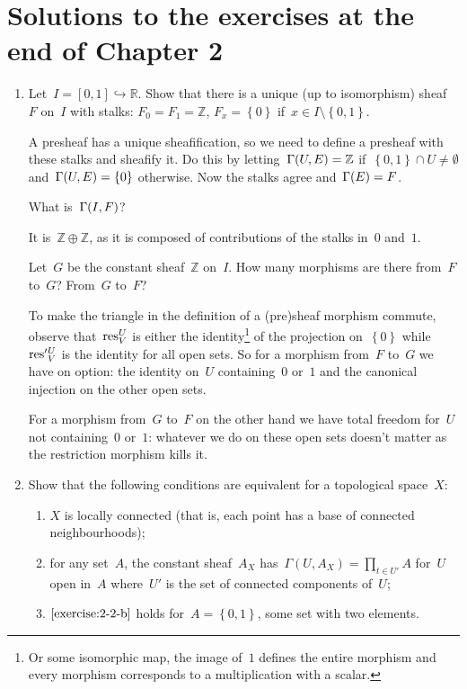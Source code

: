 \documentclass[a4paper,11pt,oneside,openany,article]{memoir}
\begin{document}
\clearpage

\chapter{Solutions to the exercises at the end of Chapter 2}
\begin{enumerate}
  \item Let~$I=[0,1]\hookrightarrow\mathbb{R}$. Show that there is a unique (up to isomorphism) sheaf~$F$ on~$I$ with stalks: $F_0=F_1=\mathbb{Z}$, $F_x=\left\{ 0 \right\}$ if~$x\in I\setminus\left\{ 0,1 \right\}$.

    \begin{solution}
      A presheaf has a unique sheafification, so we need to define a presheaf with these stalks and sheafify it. Do this by letting~$\mathrm{\Gamma}(U,E)=\mathbb{Z}$ if~$\left\{ 0,1 \right\}\cap U\neq\emptyset$ and~$\mathrm{\Gamma}(U,E)=\left\{ 0 \right\}$ otherwise. Now the stalks agree and~$\mathrm{\Gamma}(E)=F$.
    \end{solution}

    What is~$\mathrm{\Gamma}(I, F)$?

    \begin{solution}
      It is~$\mathbb{Z}\oplus\mathbb{Z}$, as it is composed of contributions of the stalks in~$0$ and~$1$.
    \end{solution}

    Let~$G$ be the constant sheaf~$\mathbb{Z}$ on~$I$. How many morphisms are there from~$F$ to~$G$? From~$G$ to~$F$?

    \begin{solution}
      To make the triangle in the definition of a (pre)sheaf morphism commute, observe that~$\mathrm{res}_V^U$ is either the identity\footnote{Or some isomorphic map, the image of~$1$ defines the entire morphism and every morphism corresponds to a multiplication with a scalar.} of the projection on~$\left\{ 0 \right\}$ while~$\mathrm{res}'{}^U_V$ is the identity for all open sets. So for a morphism from~$F$ to~$G$ we have on option: the identity on~$U$ containing~$0$ or~$1$ and the canonical injection on the other open sets.

      For a morphism from~$G$ to~$F$ on the other hand we have total freedom for~$U$ not containing~$0$ or~$1$: whatever we do on these open sets doesn't matter as the restriction morphism kills it.
    \end{solution}

  \item Show that the following conditions are equivalent for a topological space~$X$:
    \begin{enumerate}
      \item\label{exercise:2-2-a} $X$ is locally connected (that is, each point has a base of connected neighbourhoods);
      \item\label{exercise:2-2-b} for any set~$A$, the constant sheaf~$A_X$ has~$\Gamma(U,A_X)=\prod_{t\in U'}A$ for~$U$ open in~$A$ where~$U'$ is the set of connected components of~$U$;
      \item\label{exercise:2-2-c} $\ref{exercise:2-2-b}$ holds for~$A=\left\{ 0,1 \right\}$, some set with two elements.
    \end{enumerate}


\end{enumerate}
\end{document}
